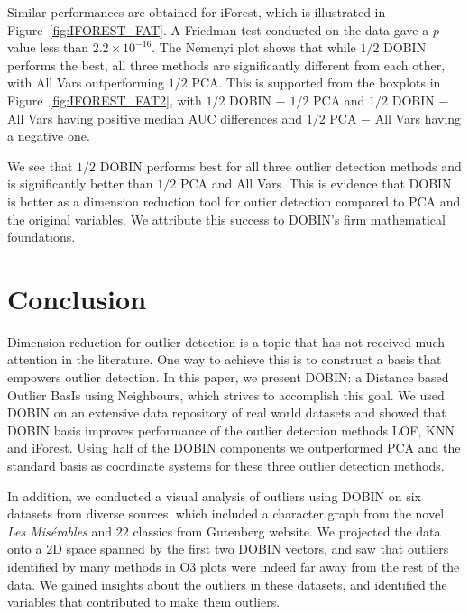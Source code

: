\documentclass[letter,12pt]{article}
\begin{document}
Similar performances are obtained for iForest, which is illustrated in Figure~\ref{fig:IFOREST_FAT}. A Friedman test conducted on the data gave a $p$-value less than $2.2 \times 10^{-16}$. The Nemenyi plot shows that while $1/2$ DOBIN performs the best, all three methods are significantly different from each other, with All Vars outperforming $1/2$ PCA. This is supported from the boxplots in Figure~\ref{fig:IFOREST_FAT2}, with $1/2$ DOBIN $-$ $1/2$ PCA and $1/2$ DOBIN $-$ All Vars having positive median AUC differences and  $1/2$ PCA $-$ All Vars having a negative one.

We see that $1/2$ DOBIN performs best for all three outlier detection methods and is significantly better than $1/2$ PCA and All Vars. This is evidence that DOBIN is better as a dimension reduction tool for outier detection compared to PCA and the original variables. We attribute this success to DOBIN's firm mathematical foundations.


\section{Conclusion}
Dimension reduction for outlier detection is a topic that has not received much attention in the literature. One way to achieve this is to construct a basis that empowers outlier detection. In this paper, we present DOBIN: a Distance based Outlier BasIs using Neighbours, which strives to accomplish this goal. We used DOBIN on an extensive data repository of real world datasets and showed that DOBIN basis improves performance of the outlier detection methods LOF, KNN and iForest. Using half of the DOBIN components we outperformed PCA and the standard basis as coordinate systems for these three outlier detection methods.

In addition, we conducted a visual analysis of outliers using DOBIN on six datasets from diverse sources, which included a character graph from the novel \textit{Les Mis\'erables} and $22$ classics from Gutenberg website. We projected the data onto a 2D space spanned by the first two DOBIN vectors, and saw that outliers identified by many methods in O3 plots were indeed far away from the rest of the data. We gained insights about the outliers in these datasets, and identified the variables that contributed to make them outliers.

\end{document}
